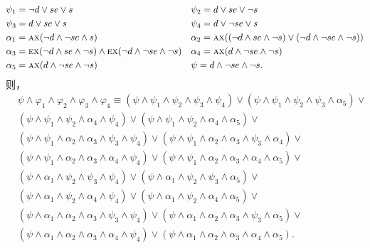 \begin{example}
\begin{align*}
		& \psi_1 = \neg d \vee se \vee s && \psi_2 = d \vee  se \vee \neg s \\
		& \psi_3 = d \vee se \vee s && \psi_4 = d \vee \neg se \vee s\\
		& \alpha_1 = \textsc{a}\textsc{x}(\neg d \wedge \neg se \wedge s) && \alpha_2 = \textsc{a}\textsc{x}((\neg d \wedge se \wedge \neg s) \vee (\neg d \wedge \neg se\wedge \neg s))\\
		& \alpha_3 = \textsc{e}\textsc{x}(\neg d \wedge se \wedge \neg s) \wedge \textsc{e}\textsc{x} (\neg d \wedge \neg se\wedge \neg s) && \alpha_4 = \textsc{a}\textsc{x}(d \wedge \neg se \wedge \neg s)\\
		& \alpha_5 = \textsc{a}\textsc{x}(d \wedge \neg se \wedge \neg s) && \psi = d \wedge \neg se \wedge \neg s.
	\end{align*}
	则，
	\begin{align*}
		& \psi \wedge \varphi_1 \wedge \varphi_2 \wedge \varphi_3\wedge \varphi_4 
		\equiv (\psi \wedge \psi_1 \wedge \psi_2 \wedge \psi_3 \wedge \psi_4) \vee (\psi \wedge \psi_1 \wedge \psi_2 \wedge \psi_3 \wedge \alpha_5) \vee\\
		& (\psi \wedge \psi_1 \wedge \psi_2 \wedge \alpha_4 \wedge \psi_4) \vee (\psi \wedge \psi_1 \wedge \psi_2 \wedge \alpha_4 \wedge \alpha_5) \vee\\
		& (\psi \wedge \psi_1 \wedge \alpha_2 \wedge \alpha_3 \wedge \psi_3 \wedge \psi_4) \vee (\psi \wedge \psi_1 \wedge \alpha_2 \wedge \alpha_3 \wedge \psi_3 \wedge \alpha_4) \vee \\
		& (\psi \wedge \psi_1 \wedge \alpha_2 \wedge \alpha_3 \wedge \alpha_4 \wedge \psi_4) \vee (\psi \wedge \psi_1 \wedge \alpha_2 \wedge \alpha_3 \wedge \alpha_4 \wedge \alpha_5) \vee\\
		& (\psi \wedge \alpha_1 \wedge \psi_2 \wedge \psi_3 \wedge \psi_4) \vee (\psi \wedge \alpha_1 \wedge \psi_2 \wedge \psi_3 \wedge \alpha_5)\vee\\
		& (\psi \wedge \alpha_1 \wedge \psi_2 \wedge \alpha_4 \wedge \psi_4) \vee (\psi \wedge \alpha_1 \wedge \psi_2 \wedge \alpha_4 \wedge\alpha_5)\vee \\
		& (\psi \wedge \alpha_1 \wedge \alpha_2 \wedge \alpha_3 \wedge \psi_3 \wedge \psi_4) \vee (\psi \wedge \alpha_1 \wedge \alpha_2 \wedge \alpha_3\wedge \psi_3 \wedge \alpha_5) \vee \\
		& (\psi \wedge \alpha_1 \wedge \alpha_2 \wedge \alpha_3 \wedge \alpha_4 \wedge \psi_4) \vee (\psi \wedge \alpha_1 \wedge \alpha_2 \wedge \alpha_3 \wedge \alpha_4 \wedge \alpha_5).\\
		\\

\end{align*}
\end{example}
